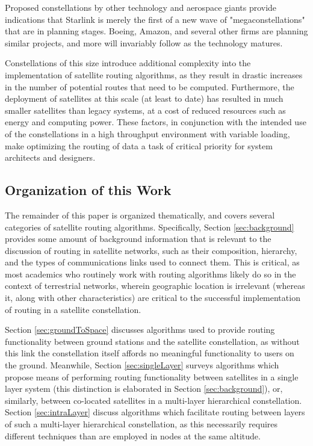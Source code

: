 Proposed constellations by other technology and aerospace giants provide indications that Starlink is merely the first of a new wave of "megaconstellations" that are in planning stages. Boeing, Amazon, and several other firms are planning similar projects, and more will invariably follow as the technology matures.

Constellations of this size introduce additional complexity into the implementation of satellite routing algorithms, as they result in drastic increases in the number of potential routes that need to be computed. Furthermore, the deployment of satellites at this scale (at least to date) has resulted in much smaller satellites than legacy systems, at a cost of reduced resources such as energy and computing power. These factors, in conjunction with the intended use of the constellations in a high throughput environment with variable loading, make optimizing the routing of data a task of critical priority for system architects and designers.

\subsection{Organization of this Work}\label{subsec:organization}
The remainder of this paper is organized thematically, and covers several categories of satellite routing algorithms. Specifically, Section \ref{sec:background} provides some amount of background information that is relevant to the discussion of routing in satellite networks, such as their composition, hierarchy, and the types of communications links used to connect them. This is critical, as most academics who routinely work with routing algorithms likely do so in the context of terrestrial networks, wherein geographic location is irrelevant (whereas it, along with other characteristics) are critical to the successful implementation of routing in a satellite constellation. 

Section \ref {sec:groundToSpace} discusses algorithms used to provide routing functionality between ground stations and the satellite constellation, as without this link the constellation itself affords no meaningful functionality to users on the ground. Meanwhile, Section \ref{sec:singleLayer} surveys algorithms which propose means of performing routing functionality between satellites in a single layer system (this distinction is elaborated in Section \ref{sec:background}), or, similarly, between co-located satellites in a multi-layer hierarchical constellation. Section \ref{sec:intraLayer} discuss algorithms which facilitate routing between layers of such a multi-layer hierarchical constellation, as this necessarily requires different techniques than are employed in nodes at the same altitude.  

